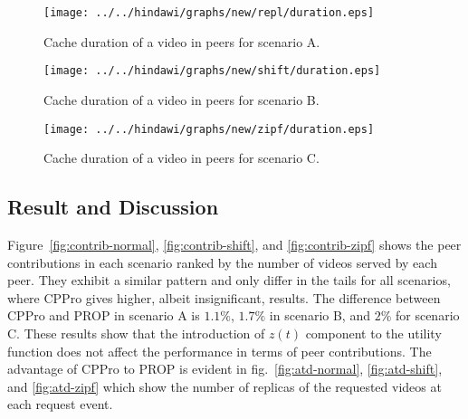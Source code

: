 \begin{figure}[!t]
\begin{center}
\texttt{[image: ../../hindawi/graphs/new/repl/duration.eps]}
\end{center}
\caption{Cache duration of a video in peers for scenario A.}
\label{fig:duration-normal}
\end{figure}

\begin{figure}[!t]
\begin{center}
\texttt{[image: ../../hindawi/graphs/new/shift/duration.eps]}
\end{center}
\caption{Cache duration of a video in peers for scenario B.}
\label{fig:duration-shift}
\end{figure}

\begin{figure}[!t]
\begin{center}
\texttt{[image: ../../hindawi/graphs/new/zipf/duration.eps]}
\end{center}
\caption{Cache duration of a video in peers for scenario C.}
\label{fig:duration-zipf}
\end{figure}


\subsection{Result and Discussion}\label{resultanddiscussion}

Figure~\ref{fig:contrib-normal}, \ref{fig:contrib-shift}, and \ref{fig:contrib-zipf} shows the peer contributions in each scenario ranked by the number of videos served by each peer.
They exhibit a similar pattern and only differ in the tails for all scenarios, where CPPro gives higher, albeit insignificant, results.
The difference between CPPro and PROP in scenario A is $1.1\%$, $1.7\%$ in scenario B, and $2\%$ for scenario C.
These results show that the introduction of $z(t)$ component to the utility function does not affect the performance in terms of peer contributions.
The advantage of CPPro to PROP is evident in fig.~\ref{fig:atd-normal}, \ref{fig:atd-shift}, and \ref{fig:atd-zipf} which show the number of replicas of the requested videos at each request event.



